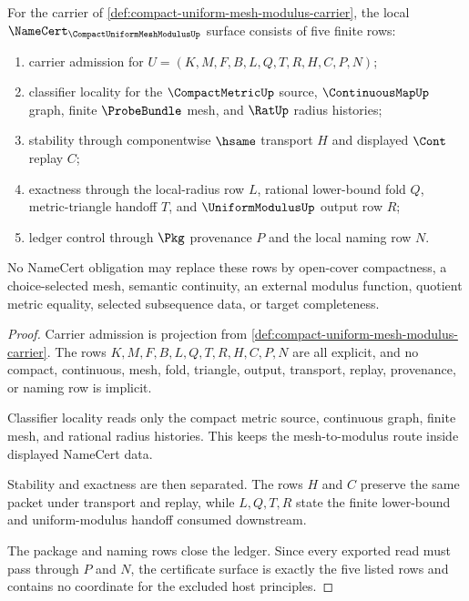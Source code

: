 \begin{theorem}
\label{thm:compact-uniform-mesh-modulus-obligation-surface}
For the carrier of \autoref{def:compact-uniform-mesh-modulus-carrier}, the local $\NameCert_{\CompactUniformMeshModulusUp}$ surface consists of five finite rows:
\begin{enumerate}
\item carrier admission for $U=(K,M,F,B,L,Q,T,R,H,C,P,N)$;
\item classifier locality for the $\CompactMetricUp$ source, $\ContinuousMapUp$ graph, finite $\ProbeBundle$ mesh, and $\RatUp$ radius histories;
\item stability through componentwise $\hsame$ transport $H$ and displayed $\Cont$ replay $C$;
\item exactness through the local-radius row $L$, rational lower-bound fold $Q$, metric-triangle handoff $T$, and $\UniformModulusUp$ output row $R$;
\item ledger control through $\Pkg$ provenance $P$ and the local naming row $N$.
\end{enumerate}
No NameCert obligation may replace these rows by open-cover compactness, a choice-selected mesh, semantic continuity, an external modulus function, quotient metric equality, selected subsequence data, or target completeness.
\end{theorem}
\begin{proof}
Carrier admission is projection from \autoref{def:compact-uniform-mesh-modulus-carrier}. The rows $K,M,F,B,L,Q,T,R,H,C,P,N$ are all explicit, and no compact, continuous, mesh, fold, triangle, output, transport, replay, provenance, or naming row is implicit.

Classifier locality reads only the compact metric source, continuous graph, finite mesh, and rational radius histories. This keeps the mesh-to-modulus route inside displayed NameCert data.

Stability and exactness are then separated. The rows $H$ and $C$ preserve the same packet under transport and replay, while $L,Q,T,R$ state the finite lower-bound and uniform-modulus handoff consumed downstream.

The package and naming rows close the ledger. Since every exported read must pass through $P$ and $N$, the certificate surface is exactly the five listed rows and contains no coordinate for the excluded host principles.
\end{proof}



